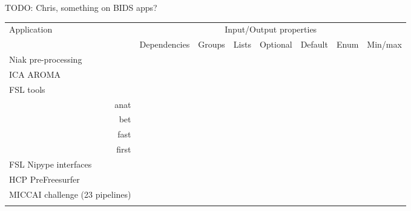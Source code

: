 \documentclass{article}
\newcommand{\todo}[2]{\color{red}TODO: #1\color{black}}
\begin{document}
\todo{Chris, something on BIDS apps?}



\todo{Sorina, a paragraph on other applications in VIP?}

\begin{table}
  \begin{tabular}{l|ccccccc}
    \rowcolor[gray]{0.9}
    Application                      & \multicolumn{7}{c}{Input/Output properties} \\
    \rowcolor[gray]{0.9}
                                     & Dependencies      &Groups             & Lists             & Optional          &Default            & Enum              & Min/max\\
    
    \hline
    Niak pre-processing              &                   &\cellcolor{gray!75}&\cellcolor{gray!75}&\cellcolor{gray!75}&\cellcolor{gray!75}&\\
    ICA AROMA                        &\cellcolor{gray!75}&\cellcolor{gray!75}&                   &\cellcolor{gray!75}&\cellcolor{gray!75}&\cellcolor{gray!75}&\cellcolor{gray!75}\\
    FSL tools &&&&&&\\
    \multicolumn{1}{r|}{anat}        &\cellcolor{gray!75}&\cellcolor{gray!75}&                   &\cellcolor{gray!75}&\cellcolor{gray!75}&\cellcolor{gray!75}&\cellcolor{gray!75}\\
    \multicolumn{1}{r|}{bet}         &\cellcolor{gray!75}&\cellcolor{gray!75}&\cellcolor{gray!75}&\cellcolor{gray!75}&                   &                   &\cellcolor{gray!75}\\      
    \multicolumn{1}{r|}{fast}        &\cellcolor{gray!75}&                   &                   &\cellcolor{gray!75}&\cellcolor{gray!75}&\cellcolor{gray!75}&\cellcolor{gray!75}\\
    \multicolumn{1}{r|}{first}       &                   &                   &\cellcolor{gray!75}&\cellcolor{gray!75}&\cellcolor{gray!75}&                   &                   \\
    FSL Nipype interfaces     \\
    HCP PreFreesurfer                &                   &                   &                   &                   &                   &                   &                   \\
    MICCAI challenge (23 pipelines)\\&                   &                   &                   &                   &                   &                   & \\

\end{tabular}
\end{table}
\end{document}
